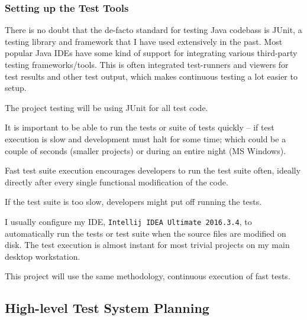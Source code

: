 %
%

\subsubsection{Setting up the Test Tools}
There is no doubt that the de-facto standard for testing Java codebass is
JUnit\cite{tools:junit}, a testing library and framework that I have used
extensively in the past.
Most popular Java IDEs have some kind of support for integrating various
third-party testing frameworks/tools. 
This is often integrated test-runners and viewers for test results and other
test output, which makes continuous testing a lot easier to setup.

The project testing will be using JUnit for all test code. 

It is important to be able to run the tests or suite of tests quickly -- if
test execution is slow and development must halt for some time; which could be
a couple of seconds (smaller projects) or during an entire night (MS Windows).

Fast test suite execution encourages developers to run the test suite often,
ideally directly after every single functional modification of the code.

If the test suite is too slow, developers might put off running the tests.

I usually configure my IDE, \texttt{Intellij IDEA Ultimate 2016.3.4}, to
automatically run the tests or test suite when the source files are modified on
disk. The test execution is almost instant for most trivial projects on my main
desktop workstation.

This project will use the same methodology, continuous execution of fast tests.


\subsection{High-level Test System Planning}
